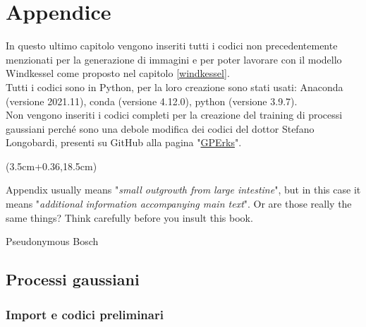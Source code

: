\chapter*{Appendice}




In questo ultimo capitolo vengono inseriti tutti i codici non precedentemente menzionati per la generazione di immagini e per poter lavorare con il modello Windkessel come proposto nel capitolo \ref{windkessel}.\\
Tutti i codici sono in Python, per la loro creazione sono stati usati: Anaconda (versione 2021.11), conda (versione 4.12.0),  python (versione 3.9.7).\\
Non vengono inseriti i codici completi per la creazione del training di processi gaussiani perché sono una debole modifica dei codici del dottor Stefano Longobardi, presenti su GitHub alla pagina "\href{https://github.com/stelong/GPErks}{GPErks}".



\begin{textblock*}{0.64\textwidth}(3.5cm+0.36\textwidth,18.5cm)
   \epigraph{Appendix usually means "\textit{small outgrowth from large intestine}", but in this case it means "\textit{additional information accompanying main text}". Or are those really the same things? Think carefully before you insult this book.}{Pseudonymous Bosch}
\end{textblock*}


\newpage

\section*{Processi gaussiani}

\subsection*{Import e codici preliminari}





